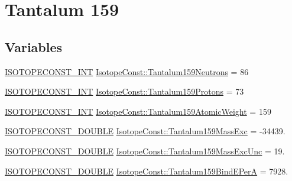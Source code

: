 \hypertarget{group___isotope_const-_tantalum-_ta159}{}\section{Tantalum 159}
\label{group___isotope_const-_tantalum-_ta159}
\subsection*{Variables}
\begin{DoxyCompactItemize}
\item 
\mbox{\hyperlink{group___isotope_const-_macros_ga5f18360b3e99483a35c32d789e62621c}{I\+S\+O\+T\+O\+P\+E\+C\+O\+N\+S\+T\+\_\+\+I\+NT}} \mbox{\hyperlink{group___isotope_const-_tantalum-_ta159_gacaa7ca11092bc2a49b681ad2526bd706}{Isotope\+Const\+::\+Tantalum159\+Neutrons}} = 86
\item 
\mbox{\hyperlink{group___isotope_const-_macros_ga5f18360b3e99483a35c32d789e62621c}{I\+S\+O\+T\+O\+P\+E\+C\+O\+N\+S\+T\+\_\+\+I\+NT}} \mbox{\hyperlink{group___isotope_const-_tantalum-_ta159_ga22aba146eb99c52b026b1c8958165125}{Isotope\+Const\+::\+Tantalum159\+Protons}} = 73
\item 
\mbox{\hyperlink{group___isotope_const-_macros_ga5f18360b3e99483a35c32d789e62621c}{I\+S\+O\+T\+O\+P\+E\+C\+O\+N\+S\+T\+\_\+\+I\+NT}} \mbox{\hyperlink{group___isotope_const-_tantalum-_ta159_gaf6ec256858cf86e7fc9265165471b1c9}{Isotope\+Const\+::\+Tantalum159\+Atomic\+Weight}} = 159
\item 
\mbox{\hyperlink{group___isotope_const-_macros_ga8f45a7272ce02c0b4c65c44636ed719a}{I\+S\+O\+T\+O\+P\+E\+C\+O\+N\+S\+T\+\_\+\+D\+O\+U\+B\+LE}} \mbox{\hyperlink{group___isotope_const-_tantalum-_ta159_ga2e00a590d7e395e01e698fd0f7bf5f98}{Isotope\+Const\+::\+Tantalum159\+Mass\+Exc}} = -\/34439.
\item 
\mbox{\hyperlink{group___isotope_const-_macros_ga8f45a7272ce02c0b4c65c44636ed719a}{I\+S\+O\+T\+O\+P\+E\+C\+O\+N\+S\+T\+\_\+\+D\+O\+U\+B\+LE}} \mbox{\hyperlink{group___isotope_const-_tantalum-_ta159_ga8322c9f35eb5727c75770675a2461e11}{Isotope\+Const\+::\+Tantalum159\+Mass\+Exc\+Unc}} = 19.
\item 
\mbox{\hyperlink{group___isotope_const-_macros_ga8f45a7272ce02c0b4c65c44636ed719a}{I\+S\+O\+T\+O\+P\+E\+C\+O\+N\+S\+T\+\_\+\+D\+O\+U\+B\+LE}} \mbox{\hyperlink{group___isotope_const-_tantalum-_ta159_ga829641c74fab0be57c7485682ee7b5f1}{Isotope\+Const\+::\+Tantalum159\+Bind\+E\+PerA}} = 7928.
\item 

\end{DoxyCompactItemize}
